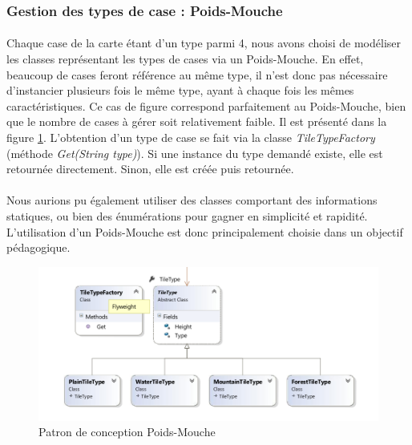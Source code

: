 \subsubsection{Gestion des types de case : Poids-Mouche}

\paragraph{}
Chaque case de la carte étant d'un type parmi 4, nous avons choisi de modéliser les classes représentant les types de cases via un Poids-Mouche.
En effet, beaucoup de cases feront référence au même type, il n'est donc pas nécessaire d'instancier plusieurs fois le même type, ayant à chaque fois les mêmes caractéristiques.
Ce cas de figure correspond parfaitement au Poids-Mouche, bien que le nombre de cases à gérer soit relativement faible. Il est présenté dans la figure \ref{fig:flyweight}.
L'obtention d'un type de case se fait via la classe \emph{TileTypeFactory} (méthode \emph{Get(String type)}). Si une instance du type demandé existe, elle est retournée directement.
Sinon, elle est créée puis retournée.

\paragraph{}
Nous aurions pu également utiliser des classes comportant des informations statiques, ou bien des énumérations pour gagner en simplicité et rapidité.
L'utilisation d'un Poids-Mouche est donc principalement choisie dans un objectif pédagogique.

\begin{figure}[h]
  \centering
  \includegraphics[width=13cm]{schemas/dp_flyweight.png}
  \caption{Patron de conception Poids-Mouche}
  \label{fig:flyweight}
\end{figure}

